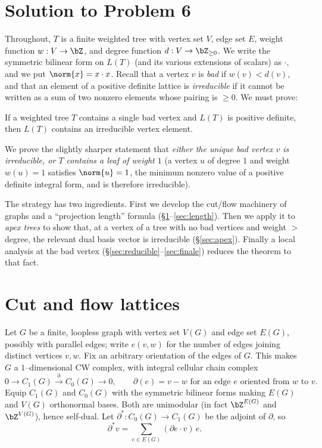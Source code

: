 \section*{Solution to Problem 6}

Throughout, $T$ is a finite weighted tree with vertex set $V$, edge set $E$, weight
function $w:V\to\bZ$, and degree function $d:V\to\bZ_{\ge 0}$.  We write the symmetric
bilinear form on $L(T)$ (and its various extensions of scalars) as $\cdot$, and we put
$\norm{x}=x\cdot x$.  Recall that a vertex $v$ is \emph{bad} if $w(v)<d(v)$, and that an
element of a positive definite lattice is \emph{irreducible} if it cannot be written as a
sum of two nonzero elements whose pairing is $\ge 0$.  We must prove:

\begin{thm}
\label{thm:one_bad_vtx}
If a weighted tree $T$ contains a single bad vertex and $L(T)$ is positive definite, then
$L(T)$ contains an irreducible vertex element.
\end{thm}

We prove the slightly sharper statement that \emph{either the unique bad vertex $v$ is
irreducible, or $T$ contains a leaf of weight $1$} (a vertex $u$ of degree $1$ and weight
$w(u)=1$ satisfies $\norm{u}=1$, the minimum nonzero value of a positive definite integral
form, and is therefore irreducible).

The strategy has two ingredients.  First we develop the cut/flow machinery of graphs and a
``projection length'' formula (\S\ref{sec:cutflow}--\ref{sec:length}).  Then we apply it to
\emph{apex trees} to show that, at a vertex of a tree with no bad vertices and weight $>$
degree, the relevant dual basis vector is irreducible
(\S\ref{sec:apex}).  Finally a local analysis at the bad vertex
(\S\ref{sec:reducible}--\ref{sec:finale}) reduces the theorem to that fact.

\section{Cut and flow lattices}
\label{sec:cutflow}

Let $G$ be a finite, loopless graph with vertex set $V(G)$ and edge set $E(G)$, possibly
with parallel edges; write $e(v,w)$ for the number of edges joining distinct vertices
$v,w$.  Fix an arbitrary orientation of the edges of $G$.  This makes $G$ a $1$--dimensional
CW complex, with integral cellular chain complex
\[
0\longrightarrow C_1(G)\overset{\partial}{\longrightarrow}C_0(G)\longrightarrow 0,
\qquad \partial(e)=v-w \text{ for an edge $e$ oriented from $w$ to $v$.}
\]
Equip $C_1(G)$ and $C_0(G)$ with the symmetric bilinear forms making $E(G)$ and $V(G)$
orthonormal bases.  Both are unimodular (in fact $\bZ^{E(G)}$ and $\bZ^{V(G)}$), hence
self-dual.  Let $\partial^\ast:C_0(G)\to C_1(G)$ be the adjoint of $\partial$, so
\[
\partial^\ast v=\sum_{e\in E(G)}(\partial e\cdot v)\,e .
\]

